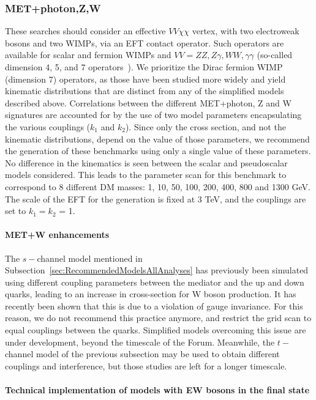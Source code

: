 \documentclass[a4,debug,notitlepage,nobib]{tufte-handout}
\begin{document}
\subsubsection{MET+photon,Z,W} 

These searches should consider an
effective $VV\chi\chi$ vertex, with two electroweak bosons and two WIMPs,
via an EFT contact operator. Such operators are available for scalar
and fermion WIMPs and $VV=ZZ,Z \gamma,WW,\gamma \gamma$ (so-called
dimension 4, 5, and 7 operators~\cite{Carpenter:2012rg,
Crivellin:2015wva}). We prioritize the Dirac fermion WIMP (dimension
7) operators, as those have been studied more widely and yield
kinematic distributions that are distinct from any of the simplified
models described above.  Correlations between the different
MET+photon, Z and W signatures are accounted for by the use of two
model parameters encapsulating the various couplings ($k_1$ and $k_2$). 
Since only the cross section, and not the kinematic
distributions, depend on the value of those parameters, we recommend
the generation of these benchmarks using only a single value of these
parameters. No difference in the kinematics is seen between the scalar
and pseudoscalar models considered.  This leads to the parameter scan
for this benchmark to correspond to 8 different DM masses: 
1, 10, 50, 100, 200, 400, 800 and 1300 GeV. The scale of the EFT
for the generation is fixed at 3 TeV, and the couplings are
set to $k_1 = k_2$ = 1. 

\paragraph{MET+W enhancements} The $s-$channel model mentioned in
Subsection~\ref{sec:RecommendedModelsAllAnalyses} has previously been
simulated using different coupling parameters between the mediator and
the up and down quarks, leading to an increase in cross-section for W
boson production. It has recently been shown \cite{Bell:2015sza} that
this is due to a violation of gauge invariance. For this reason, we do
not recommend this practice anymore, and restrict the grid scan to
equal couplings between the quarks. Simplified models overcoming this
issue are under development, beyond the timescale of the Forum.
Meanwhile, the $t-$channel model of the previous subsection may be
used to obtain different couplings and interference, but those studies
are left for a longer timescale.

\paragraph{Technical implementation of models with EW bosons in the final state} 
\end{document}
